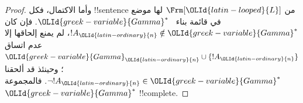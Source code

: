 \documentclass[../../../include/open-logic-section]{subfiles}
\begin{document}
\begin{proof}
وأما الاكتمال، فكل !!{sentence} من $\Frm[\OLId{latin-looped}{L}]$ لها موضع في قائمة بناء
~$\OLId{greek-variable}{Gamma}^*$. فإن كان $!A_\OLId{latin-ordinary}{n} \notin \OLId{greek-variable}{Gamma}^*$، لم يمنع إلحاقها إلا
عدم اتساق $\OLId{greek-variable}{Gamma}_\OLId{latin-ordinary}{n} \cup \{!A_\OLId{latin-ordinary}{n}\}$؛ وحينئذ قد ألحقنا
$\lnot !A_\OLId{latin-ordinary}{n} \in \OLId{greek-variable}{Gamma}^*$. فالمجموعة $\OLId{greek-variable}{Gamma}^*$ !!{complete}.
\end{proof}
\end{document}
